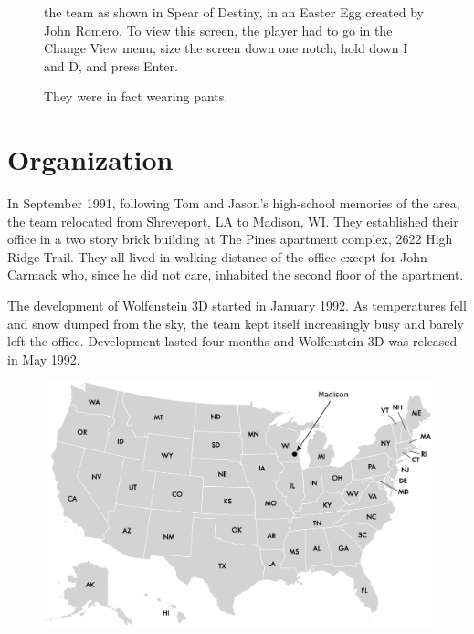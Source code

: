 \documentclass[book.tex]{subfiles}
\begin{document}
 \vspace{-10pt}
\begin{figure}[H]
\centering
      \caption{the team as shown in Spear of Destiny, in an Easter Egg created by John Romero. To view this screen, the player had to go in the Change View menu, size the screen down one notch, hold down I and D, and press Enter.}
\label{fig:id_team_1993}
\end{figure}


\begin{figure}[H]
\centering
  
    
\caption{They were in fact wearing pants.}
\label{fig:id_team_1993}
\end{figure}

\section{Organization}

In September 1991, following Tom and Jason's high-school memories of the area, the team relocated from Shreveport, LA to Madison, WI. They established their office in a two story brick building at The Pines apartment complex, 2622 High Ridge Trail. They all lived in walking distance of the office except for John Carmack who, since he did not care, inhabited the second floor of the apartment.\\
\par
The development of Wolfenstein 3D started in January 1992. As temperatures fell and snow dumped from the sky, the team kept itself increasingly busy and barely left the office. Development lasted four months and Wolfenstein 3D was released in May 1992.\\




\begin{figure}[H]
\centering
 \includegraphics[width=\textwidth]{imgs/drawings/map/usa-id-software.eps}
 \end{figure}
\end{document}
